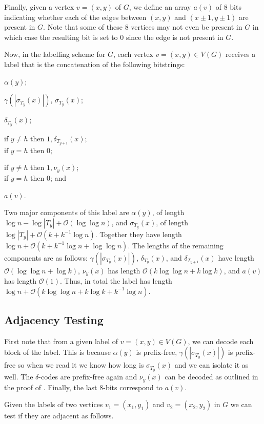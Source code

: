 \documentclass[kpfonts]{patmorin}
\newcommand{\Oh}{\mathcal{O}}
\begin{document}
Finally, given a vertex $v=(x,y)$ of $G$, we define
an array $a(v)$ of $8$ bits indicating whether each of the edges between $(x,y)$ and $(x\pm 1,y\pm 1)$ are present in $G$. Note that some of these $8$ vertices may not even be present in $G$ in which case the resulting bit is set to $0$ since the edge is not present in $G$.

Now, in the labelling scheme for $G$, each vertex $v=(x,y)\in V(G)$ receives a label that is the concatenation of the following bitstrings:
\begin{compactenum}[(P1)]
\item $\alpha(y)$;
\item $\gamma(|\sigma_{T_y}(x)|)$, $\sigma_{T_y}(x)$;
\item $\delta_{T_y}(x)$; 
\item 
if $y\neq h$ then $1,\delta_{T_{y+1}}(x)$;\\
if $y=h$ then $0$;
\item 
if $y\neq h$ then $1,\nu_y(x)$;\\
if $y=h$ then $0$; and
\item $a(v)$.
\end{compactenum}
Two major components of this label are $\alpha(y)$, of length $\log n - \log|T_y| + \Oh(\log\log n)$,
and $\sigma_{T_y}(x)$, of length $\log|T_y| + \Oh(k+k^{-1}\log n)$.
Together they have length $\log n + \Oh(k+k^{-1}\log n+\log\log n)$.
The lengths of the remaining components are as follows:
$\gamma(|\sigma_{T_y}(x)|)$,
$\delta_{T_y}(x)$, and $\delta_{T_{y+1}}(x)$
 have length $\Oh(\log\log n + \log k)$, $\nu_y(x)$ has length $\Oh(k\log\log n + k\log k)$, and $a(v)$ has length $\Oh(1)$.
Thus, in total the label has length  $\log n+ \Oh(k\log\log n + k\log k + k^{-1}\log n)$.

\subsection{Adjacency Testing}

First note that from a given label of $v=(x,y) \in V(G)$, we can decode each block of the label.
This is because $\alpha(y)$ is prefix-free, $\gamma(|\sigma_{T_y}(x)|)$ is prefix-free so when we read it we know how long is $\sigma_{T_y}(x)$ and we can isolate it as well.
The $\delta$-codes are prefix-free again and $\nu_y(x)$ can be decoded as outlined in the proof of .
Finally, the last $8$-bits correspond to $a(v)$.

Given the labels of two vertices $v_1=(x_1,y_1)$ and $v_2=(x_2,y_2)$ in $G$ we can test if they are adjacent as follows.
\end{document}
